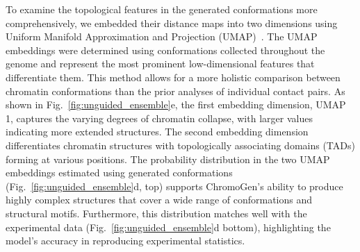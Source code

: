 \documentclass[12pt,letterpaper]{article}
\begin{document}
To examine the topological features in the generated conformations more comprehensively, we embedded their distance maps into two dimensions using Uniform Manifold Approximation and Projection (UMAP)~\cite{mcinnes2018umap}. The UMAP embeddings were determined using conformations collected throughout the genome and represent the most prominent low-dimensional features that differentiate them. This method allows for a more holistic comparison between chromatin conformations than the prior analyses of individual contact pairs. As shown in Fig.~\ref{fig:unguided_ensemble}e, the first embedding dimension, UMAP 1, captures the varying degrees of chromatin collapse, with larger values indicating more extended structures. The second embedding dimension differentiates chromatin structures with topologically associating domains (TADs) \cite{Nor12,Dixon2012} forming at various positions. The probability distribution in the two UMAP embeddings estimated using generated conformations (Fig.~\ref{fig:unguided_ensemble}d, top) supports ChromoGen's ability to produce highly complex structures that cover a wide range of conformations and structural motifs. Furthermore, this distribution matches well with the experimental data (Fig.~\ref{fig:unguided_ensemble}d bottom), highlighting the model's accuracy in reproducing experimental statistics.

\begin{comment}
\begin{figure}[H]
    \centering
    \texttt{[image: Figure2.pdf]}
    \caption{
    \textbf{ChromoGen accurately captures the conformational distribution observed in single-cell chromatin structures.} 
    (a)
    The distribution of spatial distances between monomers separated by one bond (left) and fifty bonds (right) are compared for conformations generated by ChromoGen (purple), Dip-C (orange), and a homopolymer model (green). 
    (b)
    The KL divergence between Dip-C and both ChromoGen (purple) and homopolymer (green) distance distributions such as in (a) is shown for all available loop sizes, i.e., from one bond to 63 bonds separating the relevant monomer pairs at 20 kb resolution. 
    (c)
    The radius of gyration distribution is shown for all conformations generated with ChromoGen (purple), Dip-C (orange), and the homopolymer model (green). 
    The KL divergence between the Dip-C and ChromoGen (homopolymer) distributions is 0.0281 (0.0398). 
    (d)
    Probability distributions in two-dimensional UMAP embeddings for generated (top) and Dip-C structures (bottom).    
    (e) Variations along the two UMAP embedding dimensions represent overall chromatin compaction (top) and the shifting of TAD boundaries (bottom), as shown by the corresponding average distance maps.
    From left to right, the distance maps in the top row were computed by averaging the distance maps of chromatin conformations whose embedding has a UMAP 1 value within the range [3, 3.1], [8, 8.1], and [12, 12.1]. Similarly, from left to right, the bottom panels were computed using conformations whose embedding has a UMAP 2 value within the range [-1, -0.9], [1, 1.1], and [3, 3.1].
    }
    \label{fig:unguided_ensemble}
\end{figure}
\end{comment}
\end{document}
